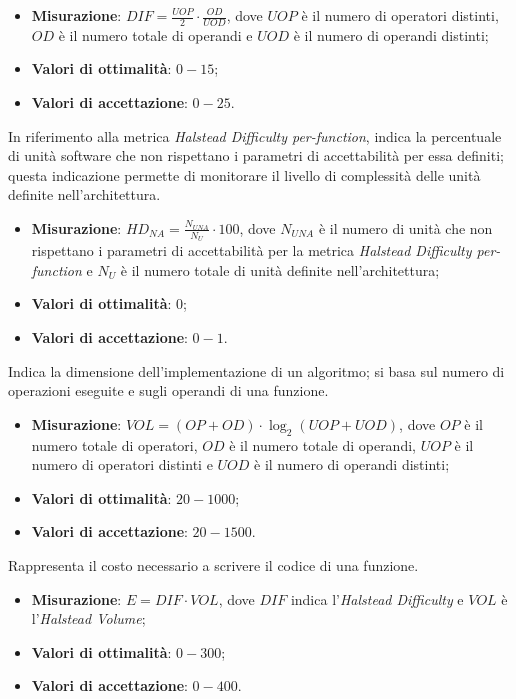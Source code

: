 \begin{itemize}
\item \textbf{Misurazione}: $DIF = \frac{UOP}{2} \cdot \frac{OD}{UOD}$, dove $UOP$ è il numero di operatori distinti, $OD$ è il numero totale di operandi e $UOD$ è il numero di operandi distinti;
\item \textbf{Valori di ottimalità}: $0 - 15$;
\item \textbf{Valori di accettazione}: $0 - 25$.
\end{itemize}
\label{halDiffNA}
In riferimento alla metrica \textit{Halstead Difficulty per-function}, indica la percentuale di unità software che non rispettano i parametri di accettabilità per essa definiti; questa indicazione permette di monitorare il livello di complessità delle unità definite nell'architettura.
\begin{itemize}
\item \textbf{Misurazione}: $HD_{NA}=\frac{N_{UNA}}{N_{U}} \cdot 100$, dove $N_{UNA}$ è il numero di unità che non rispettano i parametri di accettabilità per la metrica \textit{Halstead Difficulty per-function} e $N_{U}$ è il numero totale di unità definite nell'architettura;
\item \textbf{Valori di ottimalità}: $0$;
\item \textbf{Valori di accettazione}: $0 - 1$.
\end{itemize}
\label{halVolume}
Indica la dimensione dell'implementazione di un algoritmo; si basa sul numero di operazioni eseguite e sugli operandi di una funzione.
\begin{itemize}
\item \textbf{Misurazione}: $VOL = (OP + OD) \cdot \log_{2}(UOP + UOD)$, dove $OP$ è il numero totale di operatori, $OD$ è il numero totale di operandi, $UOP$ è il numero di operatori distinti e $UOD$ è il numero di operandi distinti;
\item \textbf{Valori di ottimalità}: $20 - 1000$;
\item \textbf{Valori di accettazione}: $20 - 1500$.
\end{itemize}
\label{halEffort}
Rappresenta il costo necessario a scrivere il codice di una funzione.
\begin{itemize}
\item \textbf{Misurazione}: $E = DIF \cdot VOL$, dove $DIF$ indica l'\textit{Halstead Difficulty} e $VOL$ è l'\textit{Halstead Volume};
\item \textbf{Valori di ottimalità}: $0 - 300$;
\item \textbf{Valori di accettazione}: $0 - 400$.
\end{itemize}
